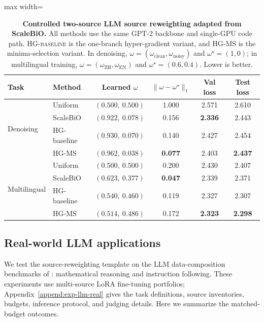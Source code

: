 \documentclass{article}
\theoremstyle{normaltheorem}
\begin{document}
\begin{table}[t]
  \centering
  \caption{\textbf{Controlled two-source LLM source reweighting adapted from ScaleBiO.}
  All methods use the same GPT-2 backbone and single-GPU code path. \textsc{HG-baseline} is the one-branch hyper-gradient variant, and \textsc{HG-MS} is the minima-selection variant. In denoising, \(\omega=(\omega_{\mathrm{clean}},\omega_{\mathrm{noisy}})\) and \(\omega^\star=(1,0)\); in multilingual training, \(\omega=(\omega_{\mathrm{ZH}},\omega_{\mathrm{EN}})\) and \(\omega^\star=(0.6,0.4)\). Lower is better.}
  \label{tab:llm-controlled}
  \begin{adjustbox}{max width=\textwidth}
  \begin{tabular}{llcccc}
    \toprule
    Task & Method & Learned \(\omega\) & \(\|\omega-\omega^\star\|_1\) & Val loss & Test loss \\
    \midrule
    \multirow{4}{*}{Denoising}
      & Uniform   & \((0.500,\ 0.500)\) & 1.000 & 2.571 & 2.610 \\
      & ScaleBiO  & \((0.922,\ 0.078)\) & 0.156 & \textbf{2.336} & 2.443 \\
      & HG-baseline & \((0.930,\ 0.070)\) & 0.140 & 2.427 & 2.454 \\
      & HG-MS     & \((0.962,\ 0.038)\) & \textbf{0.077} & 2.403 & \textbf{2.437} \\
    \midrule
    \multirow{4}{*}{Multilingual}
      & Uniform   & \((0.500,\ 0.500)\) & 0.200 & 2.430 & 2.407 \\
      & ScaleBiO  & \((0.623,\ 0.377)\) & \textbf{0.047} & 2.339 & 2.371 \\
      & HG-baseline & \((0.540,\ 0.460)\) & 0.119 & 2.327 & 2.307 \\
      & HG-MS     & \((0.514,\ 0.486)\) & 0.172 & \textbf{2.323} & \textbf{2.298} \\
    \bottomrule
  \end{tabular}
  \end{adjustbox}
\end{table}

\subsection{Real-world LLM applications}\label{subsec:llm-realworld}
We test the source-reweighting template on the LLM data-composition benchmarks of \citet{pan2025scalebio}: mathematical reasoning and instruction following. These experiments use multi-source LoRA fine-tuning portfolios; Appendix~\ref{append:exp-llm-real}
gives the task definitions, source inventories, budgets, inference protocol, and judging details. Here we summarize the
matched-budget outcomes.
\end{document}

